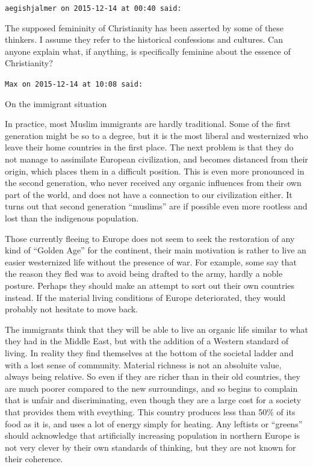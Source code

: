 \begin{footnotesize}
\begin{sffamily}
\texttt{aegishjalmer on 2015-12-14 at 00:40 said:}

The supposed femininity of Christianity has been asserted by some of these thinkers. I assume they refer to the historical confessions and cultures. Can anyone explain what, if anything, is specifically feminine about the essence of Christianity?

\hfill

\texttt{Max on 2015-12-14 at 10:08 said:}

On the immigrant situation

In practice, most Muslim immigrants are hardly traditional. Some of the first generation might be so to a degree, but it is the most liberal and westernized who leave their home countries in the first place. The next problem is that they do not manage to assimilate European civilization, and becomes distanced from their origin, which places them in a difficult position. This is even more pronounced in the second generation, who never received any organic influences from their own part of the world, and does not have a connection to our civilization either. It turns out that second generation ``muslims'' are if possible even more rootless and lost than the indigenous population.

Those currently fleeing to Europe does not seem to seek the restoration of any kind of ``Golden Age'' for the continent, their main motivation is rather to live an easier westernized life without the presence of war. For example, some say that the reason they fled was to avoid being drafted to the army, hardly a noble posture. Perhaps they should make an attempt to sort out their own countries instead. If the material living conditions of Europe deteriorated, they would probably not hesitate to move back.

The immigrants think that they will be able to live an organic life similar to what they had in the Middle East, but with the addition of a Western standard of living. In reality they find themselves at the bottom of the societal ladder and with a lost sense of community. Material richness is not an absoluite value, always being relative. So even if they are richer than in their old countries, they are much poorer compared to the new surroundings, and so begins to complain that is unfair and discriminating, even though they are a large cost for a society that provides them with eveything. This country produces less than 50\% of its food as it is, and uses a lot of energy simply for heating. Any leftists or ``greens'' should acknowledge that artificially increasing population in northern Europe is not very clever by their own standards of thinking, but they are not known for their coherence.


\end{sffamily}
\end{footnotesize}
